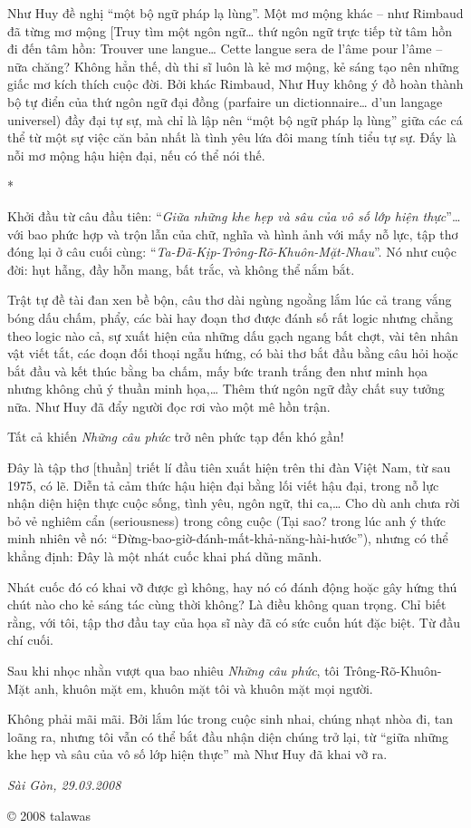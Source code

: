 \documentclass[../main.tex]{subfiles}
\begin{document}
\begin{multicols}{2}
Như Huy đề nghị “một bộ ngữ pháp lạ lùng”. Một mơ mộng khác – như Rimbaud đã từng mơ mộng [Truy tìm một ngôn ngữ… thứ ngôn ngữ trực tiếp từ tâm hồn đi đến tâm hồn: Trouver une langue… Cette langue sera de l’âme pour l’âme – nữa chăng? Không hẳn thế, dù thi sĩ luôn là kẻ mơ mộng, kẻ sáng tạo nên những giấc mơ kích thích cuộc đời. Bởi khác Rimbaud, Như Huy không ý đồ hoàn thành bộ tự điển của thứ ngôn ngữ đại đồng (parfaire un dictionnaire… d’un langage universel) đầy đại tự sự, mà chỉ là lập nên “một bộ ngữ pháp lạ lùng” giữa các cá thể từ một sự việc căn bản nhất là tình yêu lứa đôi mang tính tiểu tự sự. Đấy là nỗi mơ mộng hậu hiện đại, nếu có thể nói thế. 
        
        \begin{center}
*\end{center}
 
 Khởi đầu từ câu đầu tiên: “\textit{Giữa những khe hẹp và sâu của vô số lớp hiện thực}”… với bao phức hợp và trộn lẫn của chữ, nghĩa và hình ảnh với mấy nỗ lực, tập thơ đóng lại ở câu cuối cùng: “\textit{Ta-Đã-Kịp-Trông-Rõ-Khuôn-Mặt-Nhau}”. Nó như cuộc đời: hụt hẫng, đầy hỗn mang, bất trắc, và không thể nắm bắt.   
 
Trật tự đề tài đan xen bề bộn, câu thơ dài ngùng ngoằng lắm lúc cả trang vắng bóng dấu chấm, phẩy, các bài hay đoạn thơ được đánh số rất logic nhưng chẳng theo logic nào cả, sự xuất hiện của những dấu gạch ngang bất chợt, vài tên nhân vật viết tắt, các đoạn đối thoại ngẫu hứng, có bài thơ bắt đầu bằng câu hỏi hoặc bắt đầu và kết thúc bằng ba chấm, mấy bức tranh trắng đen như minh họa nhưng không chủ ý thuần minh họa,… Thêm thứ ngôn ngữ đầy chất suy tưởng nữa. Như Huy đã đẩy người đọc rơi vào một mê hồn trận. 
 
Tất cả khiến \textit{Những câu phức} trở nên phức tạp đến khó gần! 
 
Đây là tập thơ [thuần] triết lí đầu tiên xuất hiện trên thi đàn Việt Nam, từ sau 1975, có lẽ. Diễn tả cảm thức hậu hiện đại bằng lối viết hậu đại, trong nỗ lực nhận diện hiện thực cuộc sống, tình yêu, ngôn ngữ, thi ca,… Cho dù anh chưa rời bỏ vẻ nghiêm cẩn (seriousness) trong công cuộc (Tại sao? trong lúc anh ý thức minh nhiên về nó: “Đừng-bao-giờ-đánh-mất-khả-năng-hài-hước”), nhưng có thể khẳng định: Đây là một nhát cuốc khai phá dũng mãnh. 
 
Nhát cuốc đó có khai vỡ được gì không, hay nó có đánh động hoặc gây hứng thú chút nào cho kẻ sáng tác cùng thời không? Là điều không quan trọng. Chỉ biết rằng, với tôi, tập thơ đầu tay của họa sĩ này đã có sức cuốn hút đặc biệt. Từ đầu chí cuối.  
 
Sau khi nhọc nhằn vượt qua bao nhiêu \textit{Những câu phức}, tôi Trông-Rõ-Khuôn-Mặt anh, khuôn mặt em, khuôn mặt tôi và khuôn mặt mọi người.  
 
Không phải mãi mãi. Bởi lắm lúc trong cuộc sinh nhai, chúng nhạt nhòa đi, tan loãng ra, nhưng tôi vẫn có thể bắt đầu nhận diện chúng trở lại, từ “giữa những khe hẹp và sâu của vô số lớp hiện thực” mà Như Huy đã khai vỡ ra. 
 
\textit{Sài Gòn, 29.03.2008} 
 
© 2008 talawas 
\end{multicols}
\end{document}
